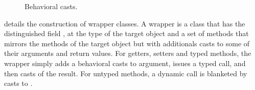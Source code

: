\documentclass[a4paper,USenglish]{tex/lipics-v2016}
\begin{document}
\begin{figure}[!ht]
\hrulefill

\vspace{-2mm}

{  \small
  \begin{mathpar}

\end{mathpar}}  

\vspace{-2mm}
\hrulefill
\caption{Behavioral casts.}\label{behave}
\end{figure}

 details the construction of wrapper classes. A wrapper is a
class that has the distinguished field \that, at the type of the target
object and a set of methods that mirrors the methods of the target object
but with additionals casts to some of their arguments and return values.
For getters, setters and typed methods, the wrapper simply adds a behavioral
casts to argument, issues a typed call, and then casts of the result. For
untyped methods, a dynamic call is blanketed by casts to \any.

\newcommand{\rtranst}[6]{#1 \Rightarrow #2 ~ #3 / #4 \vdash #5 \looparrowright_{beh} #6}
\end{document}
